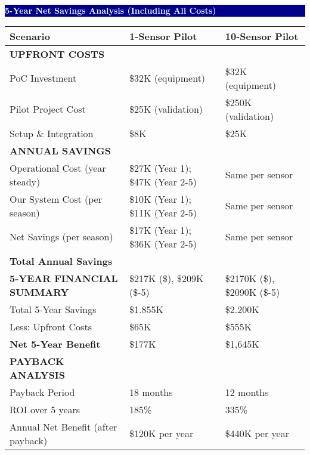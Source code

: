 \documentclass[11pt,a4paper]{article}
\begin{document}
\hfill
\begin{minipage}{0.48\textwidth}
\colorbox{darkblue}{\parbox{\linewidth}{\centering\textcolor{white}{\textbf{5-Year Net Savings Analysis (Including All Costs)}}}}

\begin{tabular}{|l|l|l|}
\hline
\textbf{Scenario} & \textbf{1-Sensor Pilot} & \textbf{10-Sensor Pilot} \\
\hline
\textbf{UPFRONT COSTS} & & \\
\hline
PoC Investment & \$32K (equipment) & \$32K (equipment) \\
\hline
Pilot Project Cost & \$25K (validation) & \$250K (validation) \\
\hline
Setup \& Integration & \$8K & \$25K \\
\hline
\textbf{ANNUAL SAVINGS} & & \\
\hline
Operational Cost (year steady) & \$27K (Year 1); \$47K (Year 2-5) & Same per sensor \\
\hline
Our System Cost (per season) & \$10K (Year 1); \$11K (Year 2-5) & Same per sensor \\
\hline
Net Savings (per season) & \$17K (Year 1); \$36K (Year 2-5) & Same per sensor \\
\hline
\textbf{Total Annual Savings} & & \\
\hline
\textbf{5-YEAR FINANCIAL SUMMARY} & \$217K (\$), \$209K (\$-5) & \$2170K (\$), \$2090K (\$-5) \\
\hline
Total 5-Year Savings & \$1.855K & \$2.200K \\
\hline
Less: Upfront Costs & \$65K & \$555K \\
\hline
\textbf{Net 5-Year Benefit} & \$177K & \$1,645K \\
\hline
\textbf{PAYBACK ANALYSIS} & & \\
\hline
Payback Period & 18 months & 12 months \\
\hline
ROI over 5 years & 185\% & 335\% \\
\hline
Annual Net Benefit (after payback) & \$120K per year & \$440K per year \\
\hline
\end{tabular}
\end{minipage}
\end{document}
